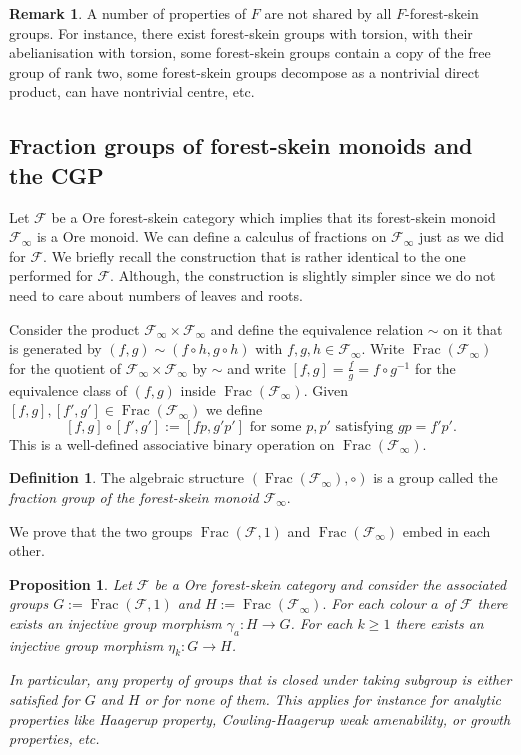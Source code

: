 \documentclass[a4paper, 12pt]{amsart}
\numberwithin{equation}{section}
\newtheorem{proposition}[theorem]{Proposition}
\theoremstyle{definition}
\newtheorem{definition}[theorem]{Definition}
\newtheorem{remark}[theorem]{Remark}
\newcommand{\cF}{\mathcal F}
\DeclareMathOperator{\Frac}{Frac}
\newcommand{\ga}{\gamma}
\begin{document}
\begin{remark}
A number of properties of $F$ are not shared by all $F$-forest-skein groups.
For instance, there exist forest-skein groups with torsion, with their abelianisation with torsion, some forest-skein groups contain a copy of the free group of rank two, some forest-skein groups decompose as a nontrivial direct product, can have nontrivial centre, etc. 
\end{remark}

\subsection{Fraction groups of forest-skein monoids and the CGP}\label{sec:CGP}

Let $\cF$ be a Ore forest-skein category which implies that its forest-skein monoid $\cF_\infty$ is a Ore monoid.
We can define a calculus of fractions on $\cF_\infty$ just as we did for $\cF$. 
We briefly recall the construction that is rather identical to the one performed for $\cF$.
Although, the construction is slightly simpler since we do not need to care about numbers of leaves and roots.

Consider the product $\cF_\infty\times\cF_\infty$ and define the equivalence relation $\sim$ on it that is generated by $(f,g)\sim (f\circ h, g\circ h)$ with $f,g,h\in\cF_\infty.$
Write $\Frac(\cF_\infty)$ for the quotient of $\cF_\infty\times\cF_\infty$ by $\sim$ and write $[f,g]=\frac{f}{g}=f\circ g^{-1}$ for the equivalence class of $(f,g)$ inside $\Frac(\cF_\infty).$
Given $[f,g],[f',g']\in \Frac(\cF_\infty)$ we define
$$[f,g]\circ [f',g']:=[fp,g'p'] \text{ for some } p,p' \text{ satisfying } gp=f'p'.$$
This is a well-defined associative binary operation on $\Frac(\cF_\infty)$.

\begin{definition}
The algebraic structure $(\Frac(\cF_\infty),\circ)$ is a group called the \textit{fraction group of the forest-skein monoid $\cF_\infty$}. 
\end{definition}

We prove that the two groups $\Frac(\cF,1)$ and $\Frac(\cF_\infty)$ embed in each other. 

\begin{proposition}\label{prop:GHinclusion}
Let $\cF$ be a Ore forest-skein category and consider the associated groups $G:=\Frac(\cF,1)$ and $H:=\Frac(\cF_\infty).$
For each colour $a$ of $\cF$ there exists an injective group morphism $\ga_a:H\to G$.
For each $k\geq 1$ there exists an injective group morphism $\eta_k:G\to H$.

In particular, any property of groups that is closed under taking subgroup is either satisfied for $G$ and $H$ or for none of them. This applies for instance for analytic properties like Haagerup property, Cowling-Haagerup weak amenability, or growth properties, etc.
\end{proposition}
\end{document}
